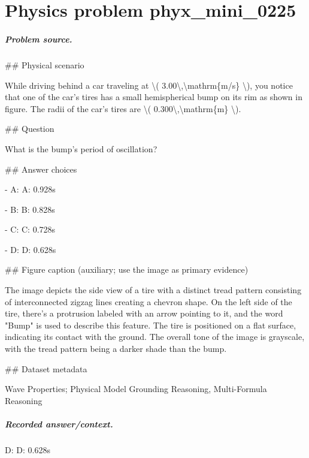 
\chapter{Physics problem phyx\_mini\_0225}
\label{ch:PhyXMiniProblems_problem_phyx_mini_0225}

\paragraph{Problem source.}
\#\# Physical scenario

While driving behind a car traveling at \textbackslash{}( 3.00\textbackslash{},\textbackslash{}mathrm\{m/s\} \textbackslash{}), you notice that one of the car's tires has a small hemispherical bump on its rim as shown in figure. The radii of the car's tires are \textbackslash{}( 0.300\textbackslash{},\textbackslash{}mathrm\{m\} \textbackslash{}).

\#\# Question

What is the bump's period of oscillation?

\#\# Answer choices

- A: A: 0.928s

- B: B: 0.828s

- C: C: 0.728s

- D: D: 0.628s

\#\# Figure caption (auxiliary; use the image as primary evidence)

The image depicts the side view of a tire with a distinct tread pattern consisting of interconnected zigzag lines creating a chevron shape. On the left side of the tire, there's a protrusion labeled with an arrow pointing to it, and the word "Bump" is used to describe this feature. The tire is positioned on a flat surface, indicating its contact with the ground. The overall tone of the image is grayscale, with the tread pattern being a darker shade than the bump.

\#\# Dataset metadata

Wave Properties; Physical Model Grounding Reasoning, Multi-Formula Reasoning

\paragraph{Recorded answer/context.}
D: D: 0.628s

